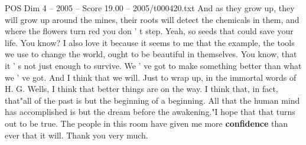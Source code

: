 \begin{textsample}{POS Dim 4 – 2005 – Score 19.00 – 2005/t000420.txt}
And as they grow up, they will grow up around the mines, their roots will detect the chemicals in them, and where the flowers turn red you don ' t step.
Yeah, so seeds that could save your life.
You know?
I also love it because it seems to me that the example, the tools we use to change the world, ought to be beautiful in themselves.
You know, that it ' s not just enough to survive.
We ' ve got to make something better than what we ' ve got.
And I think that we will.
Just to wrap up, in the immortal words of H.
G.
Wells, I think that better things are on the way.
I think that, in fact, that"all of the past is but the beginning of a beginning.
All that the human mind has accomplished is but the dream before the awakening."I hope that that turns out to be true.
The people in this room have given me more \textbf{confidence} than ever that it will.
Thank you very much.

\end{textsample}
